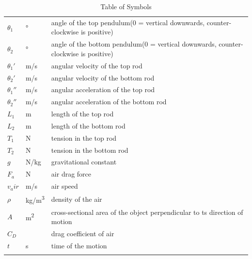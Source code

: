 \documentclass[12pt]{article}
\begin{document}
\begin{table}[H]
\begin{longtable*}{l l p{12cm}}
  \\
  $\theta_1$ & \si[per-mode=symbol] {\degree} & angle of the top pendulum(0 = vertical downwards, counter-clockwise is positive)
  \\
  $\theta_2$ & \si[per-mode=symbol] {\degree} & angle of the bottom pendulum(0 = vertical downwards, counter-clockwise is positive)
  \\ 
  ${\theta_1}'$ & \si[per-mode=symbol] {\metre\per\second} & angular velocity of the top rod
  \\
  ${\theta_2}'$ & \si[per-mode=symbol] {\metre\per\second} & angular velocity of the bottom rod
  \\
  ${\theta_1}''$ & \si[per-mode=symbol] {\metre\per\second} & angular acceleration of the top rod
  \\
  ${\theta_2}''$ & \si[per-mode=symbol] {\metre\per\second} & angular acceleration of the bottom rod
  \\
  $L_1$ & \si[per-mode=symbol] {\metre} & length of the top rod
  \\
  $L_2$ & \si[per-mode=symbol] {\metre} & length of the bottom rod
  \\
  $T_1$ & \si[per-mode=symbol] {\newton} & tension in the top rod
  \\
  $T_2$ & \si[per-mode=symbol] {\newton} & tension in the bottom rod
  \\
  $g$ & \si[per-mode=symbol] {\newton\per\kilogram} & gravitational constant
  \\
  $F_a$ & \si[per-mode=symbol] {\newton} & air drag force
  \\
  $v_air$ & \si[per-mode=symbol] {\metre\per\second} & air speed
  \\
  $\rho$ & \si[per-mode=symbol] {\kilogram\per\cubic\metre} & density of the air
  \\
  $A$ & \si[per-mode=symbol] {\square\metre} & cross-sectional area of the object perpendicular to ts direction of motion
  \\
  $C_D$ &   & drag coefficient of air
  \\
  $t$ &  \si[per-mode=symbol] {\second}  & time of the motion
  \\
  \bottomrule\\
  \end{longtable*}
  \caption{Table of Symbols} 
\end{table}
~\newline
\end{document}
